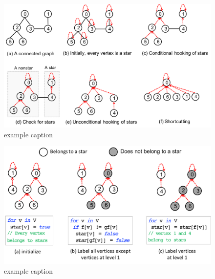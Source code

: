 \begin{figure}[htbp]
   \centering
   \includegraphics[scale=.45]{figures/example} %
   \caption{example caption}
   \label{fig:example}
\end{figure}



\begin{figure}[htbp]
   \centering
   \includegraphics[scale=.45]{figures/starcheck} %
   \caption{example caption}
   \label{fig:starcheck}
\end{figure}


